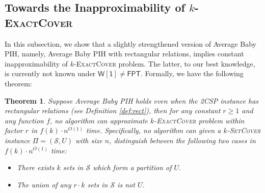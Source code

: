 \documentclass[10pt,a4paper]{article}
\newtheorem{theorem}{Theorem}
\newcommand{\wone}{\mathsf{W[1]}}
\newcommand{\fpt}{\mathsf{FPT}}
\newcommand{\kexact}{\textsc{$k$-ExactCover}}
\newcommand{\ksetcover}{\textsc{$k$-SetCover}}
\begin{document}
\subsection{Towards the Inapproximability of \kexact}
In this subsection, we show that a slightly strengthened version of Average Baby PIH, namely, Average Baby PIH with rectangular relations, implies constant inapproximability of \kexact{} problem. The latter, to our best knowledge, is currently not known under $\wone \neq \fpt$. Formally, we have the following theorem:
\begin{theorem}\label{thm:exactcover}
    Suppose Average Baby PIH holds even when the 2CSP instance has rectangular relations (see Definition \ref{def:rect}), then for any constant $r \ge 1$ and any function $f$, no algorithm can approximate \kexact{} problem within factor $r$ in $f(k)\cdot n^{O(1)}$ time. Specifically, no algorithm can given a \ksetcover{} instance $\Pi=(\mathcal S,U)$ with size $n$, distinguish between the following two cases in $f(k)\cdot n^{O(1)}$ time:
    \begin{itemize}
        \item There exists $k$ sets in $\mathcal S$ which form a partition of $U$.
        \item The union of any $r\cdot k$ sets in $\mathcal S$ is not $U$.
    \end{itemize}
\end{theorem}
\end{document}
